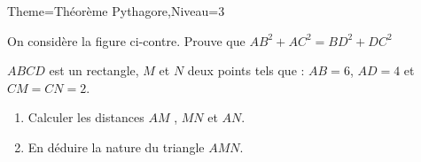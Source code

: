 \documentclass[a4paper,12pt]{article}
\begin{document}
\begin{Maquette}[Fiche]{Theme=Théorème Pythagore,Niveau=3}
\begin{exercice}
\begin{minipage}{0.5\linewidth}
On considère la figure ci-contre. Prouve que $AB^{2}+AC^{2}=BD^{2}+DC^{2}$
\end{minipage}%
\begin{minipage}{.5\linewidth}
\end{minipage}
\end{exercice}

\begin{exercice}
\begin{minipage}{.6\linewidth}
$ABCD$ est un rectangle, $M$ et $N$ deux points tels que : $AB=6$, $AD=4$ et $CM=CN=2$.
\begin{enumerate}
\item Calculer les distances $AM$ , $MN$ et $AN$.
\item En déduire la nature du triangle $AMN$.
\end{enumerate}
\end{minipage}%
\begin{minipage}{.4\linewidth}
\end{minipage}
\end{exercice}


\end{Maquette}
\end{document}
